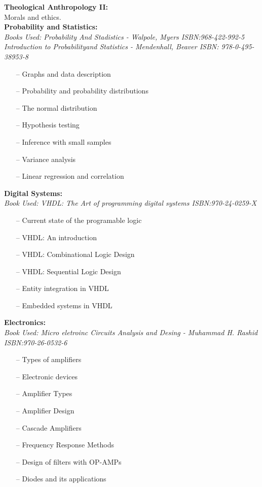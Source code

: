 \documentclass{article}
\begin{document}
\textbf{Theological Anthropology II:}\\
    Morals and ethics.\\

\textbf{Probability and Statistics:}\\
    \emph{Books Used: Probability And Stadistics - Walpole, Myers    ISBN:968-422-992-5}\\
    \emph{Introduction to Probabilityand Statistics - Mendenhall, Beaver ISBN: 978-0-495-38953-8}\
    \begin{itemize}
     \setlength\itemsep{0pt}
        \item[--] Graphs and data description
        \item[--] Probability and probability distributions
        \item[--] The normal distribution
        \item[--] Hypothesis testing
        \item[--] Inference with small samples
        \item[--] Variance analysis
        \item[--] Linear regression and correlation
    \end{itemize}

\textbf{Digital Systems:}\\
        \emph{Book Used: VHDL: The Art of programming digital systems  ISBN:970-24-0259-X}
    \begin{itemize}
     \setlength\itemsep{0pt}
      \item[--] Current state of the programable logic
      \item[--] VHDL: An introduction
      \item[--] VHDL: Combinational Logic Design
      \item[--] VHDL: Sequential Logic Design
      \item[--] Entity integration in VHDL
      \item[--] Embedded systems in VHDL
    \end{itemize}
 
\textbf{Electronics:}\\
    \emph{Book Used: Micro eletroinc Circuits Analysis and Desing - Muhammad H. Rashid ISBN:970-26-0532-6}
       \begin{itemize}
     \setlength\itemsep{0pt}
       \item[--] Types of amplifiers
       \item[--] Electronic devices
       \item[--] Amplifier Types
       \item[--] Amplifier Design
       \item[--] Cascade Amplifiers
       \item[--] Frequency Response Methods
       \item[--] Design of filters with OP-AMPs
       \item[--] Diodes and its applications
       \end{itemize}
\end{document}
